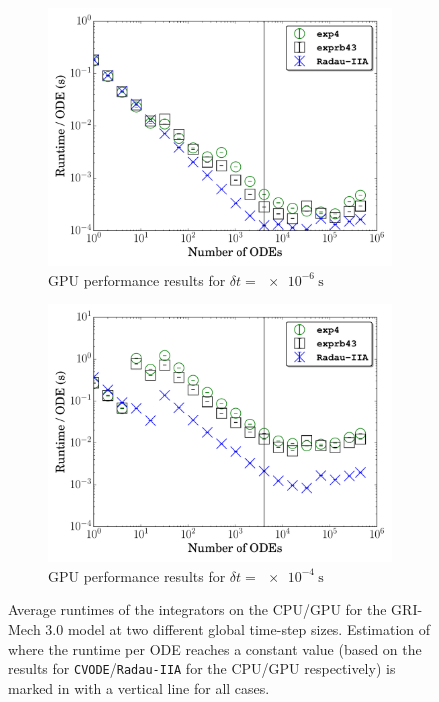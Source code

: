 \documentclass[final,twocolumn]{elsarticle}
\begin{document}
\begin{figure}[htb]
  \begin{subfigure}{0.49\textwidth}
      \includegraphics[width=\linewidth]{CH4_1e-06_gpu.pdf}
      \caption{GPU performance results for $\delta t = \SI{e-6}{\second}$}
      \label{F:ch4_gpu_perf_small}
  \end{subfigure}
  \begin{subfigure}{0.49\textwidth}
      \includegraphics[width=\linewidth]{CH4_1e-04_gpu.pdf}
      \caption{GPU performance results for $\delta t = \SI{e-4}{\second}$}
      \label{F:ch4_gpu_perf_large}
  \end{subfigure}
  \caption{Average runtimes of the integrators on the CPU\slash GPU for the GRI-Mech 3.0 model at two different global time-step sizes.
  Estimation of where the runtime per ODE reaches a constant value (based on the results for \texttt{CVODE}\slash\texttt{Radau-IIA} for the CPU\slash GPU respectively) is marked in with a vertical line for all cases.}
  \label{F:CH4_perf}
\end{figure}
\end{document}
